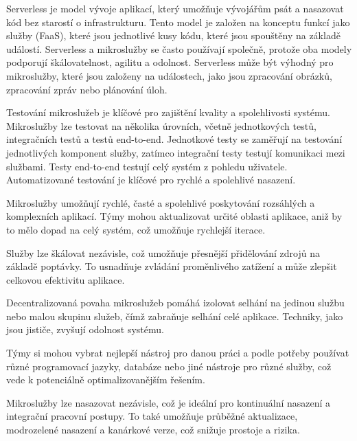 
Serverless je model vývoje aplikací, který umožňuje vývojářům psát a nasazovat kód bez starostí o infrastrukturu. Tento model je založen na konceptu funkcí jako služby (FaaS), které jsou jednotlivé kusy kódu, které jsou spouštěny na základě událostí. Serverless a mikroslužby se často používají společně, protože oba modely podporují škálovatelnost, agilitu a odolnost. Serverless může být výhodný pro mikroslužby, které jsou založeny na událostech, jako jsou zpracování obrázků, zpracování zpráv nebo plánování úloh.


Testování mikroslužeb je klíčové pro zajištění kvality a spolehlivosti systému. Mikroslužby lze testovat na několika úrovních, včetně jednotkových testů, integračních testů a testů end-to-end. Jednotkové testy se zaměřují na testování jednotlivých komponent služby, zatímco integrační testy testují komunikaci mezi službami. Testy end-to-end testují celý systém z pohledu uživatele. Automatizované testování je klíčové pro rychlé a spolehlivé nasazení.




Mikroslužby umožňují rychlé, časté a spolehlivé poskytování rozsáhlých a komplexních aplikací. Týmy mohou aktualizovat určité oblasti aplikace, aniž by to mělo dopad na celý systém, což umožňuje rychlejší iterace.


Služby lze škálovat nezávisle, což umožňuje přesnější přidělování zdrojů na základě poptávky. To usnadňuje zvládání proměnlivého zatížení a může zlepšit celkovou efektivitu aplikace.


Decentralizovaná povaha mikroslužeb pomáhá izolovat selhání na jedinou službu nebo malou skupinu služeb, čímž zabraňuje selhání celé aplikace. Techniky, jako jsou jističe, zvyšují odolnost systému.


Týmy si mohou vybrat nejlepší nástroj pro danou práci a podle potřeby používat různé programovací jazyky, databáze nebo jiné nástroje pro různé služby, což vede k potenciálně optimalizovanějším řešením.


Mikroslužby lze nasazovat nezávisle, což je ideální pro kontinuální nasazení a integrační pracovní postupy. To také umožňuje průběžné aktualizace, modrozelené nasazení a kanárkové verze, což snižuje prostoje a rizika.

